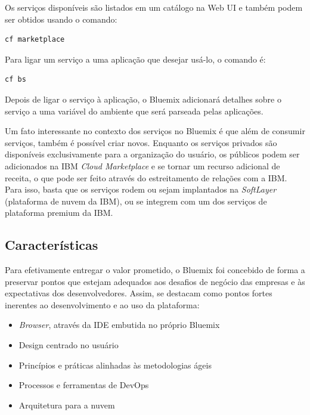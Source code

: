 Os serviços disponíveis são listados em um catálogo na Web UI e também podem ser obtidos usando o comando:
\begin{lstlisting}
cf marketplace
\end{lstlisting}

Para ligar um serviço a uma aplicação que desejar usá-lo, o comando é:
\begin{lstlisting}
cf bs
\end{lstlisting}

Depois de ligar o serviço à aplicação, o Bluemix adicionará detalhes sobre o serviço a uma variável do ambiente que será parseada pelas aplicações.

Um fato interessante no contexto dos serviços no Bluemix é que além de consumir serviços, também é possível criar novos. Enquanto os serviços privados são disponíveis exclusivamente para a organização do usuário, os públicos podem ser adicionados na IBM \textit{Cloud Marketplace} e se tornar um recurso adicional de receita, o que pode ser feito através do estreitamento de relações com a IBM. Para isso, basta que os serviços rodem ou sejam implantados na \textit{SoftLayer} (plataforma de nuvem da IBM), ou se integrem com um dos serviços de plataforma premium da IBM.

\subsection{Características}

Para efetivamente entregar o valor prometido, o Bluemix foi concebido de forma a preservar pontos que estejam adequados aos desafios de negócio das empresas e às expectativas dos desenvolvedores. Assim, se destacam como pontos fortes inerentes ao desenvolvimento e ao uso da plataforma:
\begin{itemize}
    \item \textit{Browser}, através da IDE embutida no próprio Bluemix
    \item  Design centrado no usuário
    \item  Princípios e práticas alinhadas às metodologias ágeis
    \item  Processos e ferramentas de DevOps
    \item  Arquitetura para a nuvem
\end{itemize}

